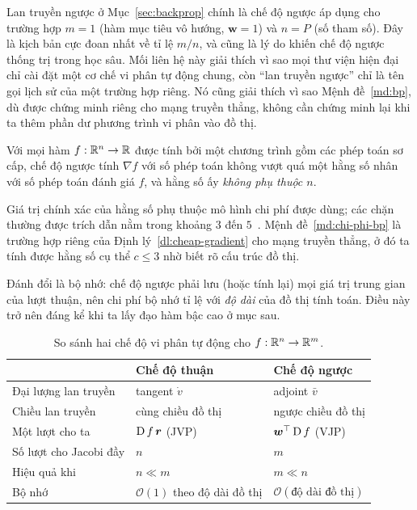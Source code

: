 \begin{nhanxet}
\label{nx:bp-is-reverse}
Lan truyền ngược ở Mục~\ref{sec:backprop} chính là chế độ ngược áp dụng cho
trường hợp $m = 1$ (hàm mục tiêu vô hướng, $\bm{w} = 1$) và $n = P$ (số tham
số). Đây là kịch bản cực đoan nhất về tỉ lệ $m/n$, và cũng là lý do khiến chế độ
ngược thống trị trong học sâu. Mối liên hệ này giải thích vì sao mọi thư viện
hiện đại~\cite{paszke2019} chỉ cài đặt một cơ chế vi phân tự động chung, còn
``lan truyền ngược'' chỉ là tên gọi lịch sử của một trường hợp riêng. Nó cũng
giải thích vì sao Mệnh đề~\ref{md:bp}, dù được chứng minh riêng cho mạng truyền
thẳng, không cần chứng minh lại khi ta thêm phần dư phương trình vi phân vào đồ
thị.
\end{nhanxet}
 
\begin{dinhly}
\label{dl:cheap-gradient}
Với mọi hàm $f:\mathbb{R}^n \to \mathbb{R}$ được tính bởi một chương trình gồm các phép toán sơ
cấp, chế độ ngược tính $\nabla f$ với số phép toán không vượt quá một hằng số
nhân với số phép toán đánh giá $f$, và hằng số ấy \emph{không phụ thuộc $n$}.
\end{dinhly}
 
Giá trị chính xác của hằng số phụ thuộc mô hình chi phí được dùng; các chặn
thường được trích dẫn nằm trong khoảng $3$ đến $5$~\cite{griewank2008}.
Mệnh đề~\ref{md:chi-phi-bp} là trường hợp riêng của
Định lý~\ref{dl:cheap-gradient} cho mạng truyền thẳng, ở đó ta tính được hằng số
cụ thể $c \le 3$ nhờ biết rõ cấu trúc đồ thị.
 
Đánh đổi là bộ nhớ: chế độ ngược phải lưu (hoặc tính lại) mọi giá trị trung gian
của lượt thuận, nên chi phí bộ nhớ tỉ lệ với \emph{độ dài} của đồ thị tính toán.
Điều này trở nên đáng kể khi ta lấy đạo hàm bậc cao ở mục sau.
 
\begin{table}[htbp]
\centering
\caption{So sánh hai chế độ vi phân tự động cho $f:\mathbb{R}^n\to\mathbb{R}^m$.}
\label{tab:ad-modes}
\begin{tabular}{@{}lll@{}}
\toprule
 & Chế độ thuận & Chế độ ngược \\
\midrule
Đại lượng lan truyền   & tangent $\dot{v}$          & adjoint $\bar{v}$ \\
Chiều lan truyền       & cùng chiều đồ thị          & ngược chiều đồ thị \\
Một lượt cho ta        & $\operatorname{D} f\,\bm{r}$ (JVP)       & $\bm{w}^{\top}\operatorname{D} f$ (VJP) \\
Số lượt cho Jacobi đầy & $n$                        & $m$ \\
Hiệu quả khi           & $n \ll m$                  & $m \ll n$ \\
Bộ nhớ                 & $\mathcal{O}(1)$ theo độ dài đồ thị
                       & $\mathcal{O}(\text{độ dài đồ thị})$ \\
\bottomrule
\end{tabular}
\end{table}
 
